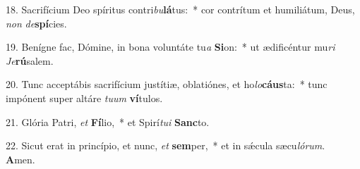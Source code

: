 18. Sacrifícium Deo spíritus contri\textit{bu}\textbf{lá}tus:~*  cor contrítum et humiliátum, Deus, \textit{non} \textit{de}\textbf{spí}cies.\

19. Benígne fac, Dómine, in bona voluntáte tu\textit{a} \textbf{Si}on:~*  ut ædificéntur mu\textit{ri} \textit{Je}\textbf{rú}salem.\

20. Tunc acceptábis sacrifícium justítiæ, oblatiónes, et ho\textit{lo}\textbf{cáus}ta:~*  tunc impónent super altáre \textit{tu}\textit{um} \textbf{ví}tulos.\

21. Glória Patri, \textit{et} \textbf{Fí}lio,~*  et Spirí\textit{tu}\textit{i} \textbf{Sanc}to.\

22. Sicut erat in princípio, et nunc, \textit{et} \textbf{sem}per,~*  et in sǽcula sæcu\textit{ló}\textit{rum}. \textbf{A}men.\

